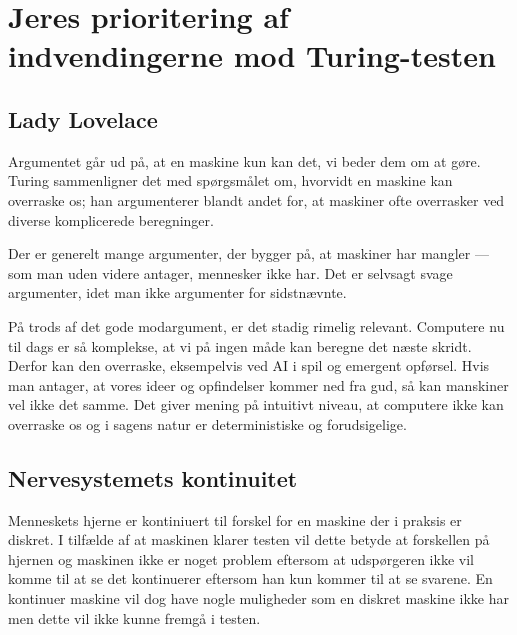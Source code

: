 \documentclass{article}
\begin{document}

\section{Jeres prioritering af indvendingerne mod Turing-testen}
\subsection{Lady Lovelace}
Argumentet går ud på, at en maskine kun kan det, vi beder dem om at gøre. Turing sammenligner det med spørgsmålet om, hvorvidt en maskine kan overraske os; han argumenterer blandt andet for, at maskiner ofte overrasker ved diverse komplicerede beregninger.

Der er generelt mange argumenter, der bygger på, at maskiner har mangler --- som man uden videre antager, mennesker ikke har. Det er selvsagt svage argumenter, idet man ikke argumenter for sidstnævnte.

På trods af det gode modargument, er det stadig rimelig relevant. Computere nu til dags er så komplekse, at vi på ingen måde kan beregne det næste skridt. Derfor kan den overraske, eksempelvis ved AI i spil og emergent opførsel. Hvis man antager, at vores ideer og opfindelser kommer ned fra gud, så kan manskiner vel ikke det samme. Det giver mening på intuitivt niveau, at computere ikke kan overraske os og i sagens natur er deterministiske og forudsigelige.

\subsection{Nervesystemets kontinuitet}

Menneskets hjerne er kontiniuert til forskel for en maskine der i praksis er diskret. I tilfælde af at maskinen klarer testen vil dette betyde at forskellen på hjernen og maskinen ikke er noget problem eftersom at udspørgeren ikke vil komme til at se det kontinuerer eftersom han kun kommer til at se svarene. En kontinuer maskine vil dog have nogle muligheder som en diskret maskine ikke har men dette vil ikke kunne fremgå i testen. 
\end{document}
